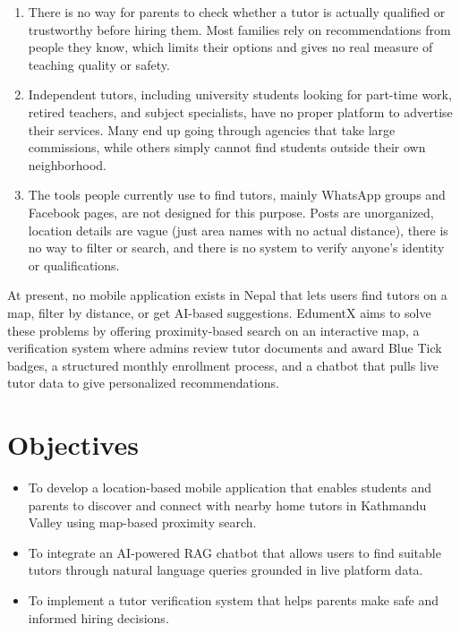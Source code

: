 \documentclass[12pt]{report}
\begin{document}
{\renewcommand{\labelenumi}{(\roman{enumi})}
\begin{enumerate}
\item There is no way for parents to check whether a tutor is
actually qualified or trustworthy before hiring them. Most
families rely on recommendations from people they know, which
limits their options and gives no real measure of teaching
quality or safety.

\item Independent tutors, including university students looking
for part-time work, retired teachers, and subject specialists,
have no proper platform to advertise their services. Many end
up going through agencies that take large commissions, while
others simply cannot find students outside their own
neighborhood.

\item The tools people currently use to find tutors, mainly
WhatsApp groups and Facebook pages, are not designed for this
purpose. Posts are unorganized, location details are vague
(just area names with no actual distance), there is no way to
filter or search, and there is no system to verify anyone's
identity or qualifications.
\end{enumerate}
}

At present, no mobile application exists in Nepal that lets
users find tutors on a map, filter by distance, or get
AI-based suggestions. EdumentX aims to solve these problems
by offering proximity-based search on an interactive map, a
verification system where admins review tutor documents and
award Blue Tick badges, a structured monthly enrollment
process, and a chatbot that pulls live tutor data to give
personalized recommendations.

\section{Objectives}

\begin{itemize}
\item To develop a location-based mobile application that enables
students and parents to discover and connect with nearby home
tutors in Kathmandu Valley using map-based proximity search.

\item To integrate an AI-powered RAG chatbot that allows users to
find suitable tutors through natural language queries grounded
in live platform data.

\item To implement a tutor verification system that helps parents
make safe and informed hiring decisions.
\end{itemize}
\end{document}
